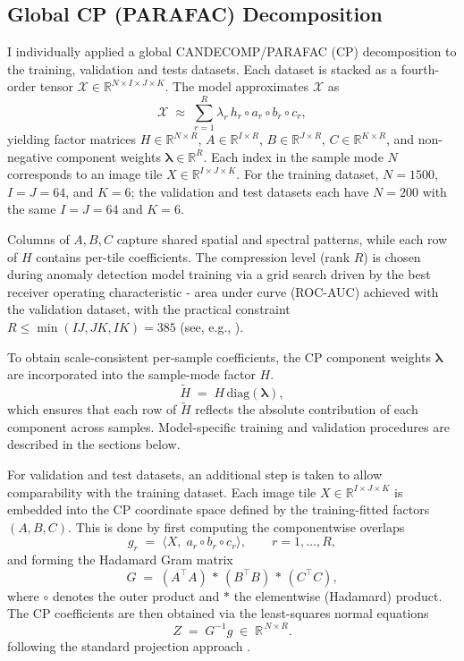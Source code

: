 \documentclass[11pt]{article}
\begin{document}
\subsection{Global CP (PARAFAC) Decomposition}

I individually applied a global CANDECOMP/PARAFAC (CP) decomposition to the training, validation and tests datasets. Each dataset is
stacked as a fourth-order tensor \(\mathcal{X}\in\mathbb{R}^{N\times I\times J\times K}\). The model approximates \(\mathcal{X}\) as
\[
\mathcal{X} \;\approx\; \sum_{r=1}^{R}\lambda_r \, h_r \!\circ a_r \!\circ b_r \!\circ c_r,
\]
yielding factor matrices \(H\in\mathbb{R}^{N\times R}\),
\(A\in\mathbb{R}^{I\times R}\), \(B\in\mathbb{R}^{J\times R}\),
\(C\in\mathbb{R}^{K\times R}\), and non-negative component weights
\(\boldsymbol{\lambda}\in\mathbb{R}^{R}\).
Each index in the sample mode \(N\) corresponds to an image tile \(X\in\mathbb{R}^{I\times J\times K}\).
For the training dataset, \(N=1500\), \(I=J=64\), and \(K=6\); the validation and test datasets each have \(N=200\) with the same \(I=J=64\) and \(K=6\).

Columns of \(A,B,C\) capture shared spatial and spectral patterns,
while each row of \(H\) contains per-tile coefficients.
The compression level (rank \(R\)) is chosen during anomaly detection model training via a grid search driven by the best receiver operating characteristic - area under curve (ROC-AUC) achieved with the validation dataset,
with the practical constraint \(R\le \min(IJ,JK,IK)=385\)
(see, e.g., \citep{KoldaBader2009,Bro1997}).

\noindent To obtain scale-consistent per-sample coefficients,
the CP component weights \(\boldsymbol{\lambda}\) are incorporated into the sample-mode factor \(H\).
\[
\tilde H \;=\; H\,\mathrm{diag}(\boldsymbol{\lambda}),
\]
which ensures that each row of \(\tilde H\) reflects the absolute contribution of each component
across samples. Model-specific training and validation
procedures are described in the sections below.

\noindent For validation and test datasets, an additional step is taken to allow comparability with the training dataset. Each image tile \(X\in\mathbb{R}^{I\times J\times K}\)
is embedded into the CP coordinate space defined by the training-fitted factors \((A,B,C)\).
This is done by first computing the componentwise overlaps
\[
g_r \;=\; \big\langle X,\; a_r \circ b_r \circ c_r \big\rangle,
\qquad r=1,\dots,R,
\]
and forming the Hadamard Gram matrix
\[
G \;=\; (A^\top A)\,\ast\,(B^\top B)\,\ast\,(C^\top C),
\]
where \(\circ\) denotes the outer product and \(\ast\) the elementwise (Hadamard) product.
The CP coefficients are then obtained via the least-squares normal equations
\[
Z \;=\; G^{-1} g \;\in\; \mathbb{R}^{\,N \times R}.
\]
following the standard projection approach
\citep{Kiers2000,SorensenBro2009}.
\end{document}
